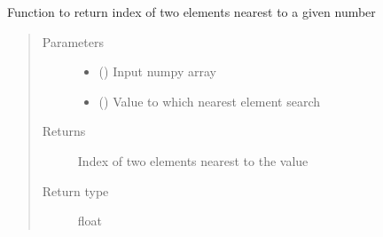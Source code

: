 \documentclass[letterpaper,10pt,english]{sphinxmanual}
\begin{document}

\begin{fulllineitems}
\label{\detokenize{paircars:paircars.basic_func.getnearpos}}
\sphinxAtStartPar
Function to return index of two elements nearest to a given number
\begin{quote}\begin{description}
\item[{Parameters}] \leavevmode\begin{itemize}
\item {} 
\sphinxAtStartPar
{} () \textendash{} Input numpy array

\item {} 
\sphinxAtStartPar
{} () \textendash{} Value to which nearest element search

\end{itemize}

\item[{Returns}] \leavevmode
\sphinxAtStartPar
Index of two elements nearest to the value

\item[{Return type}] \leavevmode
\sphinxAtStartPar
float

\end{description}\end{quote}

\end{fulllineitems}

\end{document}
